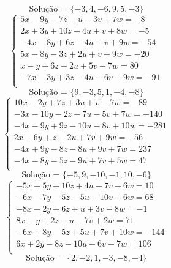 \documentclass[12pt,oneside,a4paper]{article}
\begin{document}
\begin{equation*}
\text{Solução = }\{-3,4,-6,9,5,-3\}
\end{equation*}
\vspace{\baselineskip}
\begin{equation*}
\begin{cases}
5x-9y-7z-u-3v+7w=-8 \\
2x+3y+10z+4u+v+8w=-5 \\
-4x-8y+6z-4u-v+9w=-54 \\
5x-8y-3z+2u+v+9w=-20 \\
x-y+6z+2u+5v-7w=80 \\
-7x-3y+3z-4u-6v+9w=-91 \\
\end{cases}
\end{equation*}
\begin{equation*}
\text{Solução = }\{9,-3,5,1,-4,-8\}
\end{equation*}
\vspace{\baselineskip}
\begin{equation*}
\begin{cases}
10x-2y+7z+3u+v-7w=-89 \\
-3x-10y-2z-7u-5v+7w=-140 \\
-4x-9y+9z-10u-8v+10w=-281 \\
2x-6y+z-2u+7v+9w=-56 \\
-4x+9y-8z-8u+9v+7w=237 \\
-4x-8y-5z-9u+7v+5w=47 \\
\end{cases}
\end{equation*}
\begin{equation*}
\text{Solução = }\{-5,9,-10,-1,10,-6\}
\end{equation*}
\vspace{\baselineskip}
\begin{equation*}
\begin{cases}
-5x+5y+10z+4u-7v+6w=10 \\
-6x-7y-5z-5u-10v+6w=68 \\
-8x-2y+6z+u+3v-8w=-1 \\
8x-y+2z-u-7v+2w=71 \\
-6x+8y-5z+5u+7v+10w=-144 \\
6x+2y-8z-10u-6v-7w=106 \\
\end{cases}
\end{equation*}
\begin{equation*}
\text{Solução = }\{2,-2,1,-3,-8,-4\}
\end{equation*}
\end{document}
